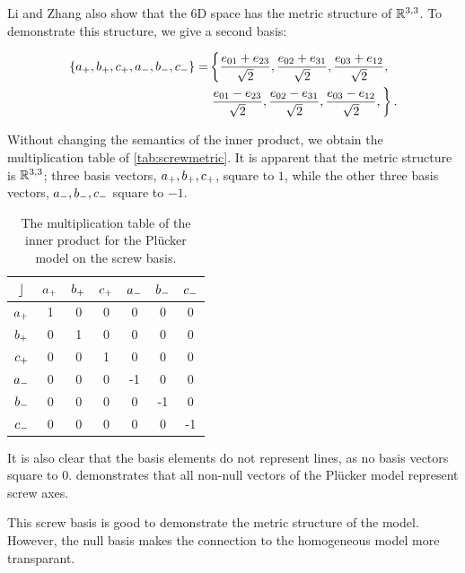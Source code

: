Li and Zhang also show that the 6D space has the metric structure of $\mathbb{R}^{3,3}$.  To demonstrate this structure, we give a second basis:

\begin{equation*}
  \begin{split}
  \left\{a_{+}, b_{+}, c_{+}, a_{-}, b_{-}, c_{-}\right\} =
    & \left\{ \frac{e_{01} + e_{23}}{\sqrt{2}}, \frac{e_{02} + e_{31}}{\sqrt{2}}, \frac{e_{03} + e_{12}}{\sqrt{2}}, \right.\\
    & \left.  \frac{e_{01} - e_{23}}{\sqrt{2}}, \frac{e_{02} - e_{31}}{\sqrt{2}}, \frac{e_{03} - e_{12}}{\sqrt{2}}, \right\}
.
\end{split}
\end{equation*}

Without changing the semantics of the inner product, we obtain the multiplication table of \autoref{tab:screwmetric}.  It is apparent that the metric structure is $\mathbb{R}^{3,3}$; three basis vectors, $a_{+}, b_{+}, c_{+}$, square to $1$, while the other three basis vectors, $a_{-}, b_{-}, c_{-}$ square to $-1$.  

\begin{table}
  \caption{The multiplication table of the inner product for the Pl\"ucker model on the screw basis.}
  \label{tab:screwmetric}
  \begin{center}
    \begin{tabular}{|c||c|c|c|c|c|c|}
      \hline
      $\mathbin{\rfloor}$ & $a_{+}$ & $b_{+}$ & $c_{+}$ & $a_{-}$ & $b_{-}$ & $c_{-}$ \\
      \hline \hline
      $a_{+}$ & 1 & 0 & 0 & 0 & 0 & 0 \\
      \hline
      $b_{+}$ & 0 & 1 & 0 & 0 & 0 & 0 \\
      \hline
      $c_{+}$ & 0 & 0 & 1 & 0 & 0 & 0 \\
      \hline
      $a_{-}$ & 0 & 0 & 0 & -1 & 0 & 0 \\
      \hline
      $b_{-}$ & 0 & 0 & 0 & 0 & -1 & 0 \\
      \hline
      $c_{-}$ & 0 & 0 & 0 & 0 & 0 & -1 \\
      \hline
    \end{tabular}
  \end{center}
\end{table}

It is also clear that the basis elements do not represent lines, as no basis vectors square to $0$.   demonstrates that all non-null vectors of the Pl\"ucker model represent screw axes.  

This screw basis is good to demonstrate the metric structure of the model.  However, the null basis makes the connection to the homogeneous model more transparant.  


